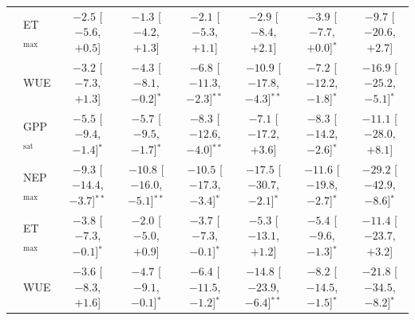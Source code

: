 \begin{table}[htbp]
{\begin{tabular}{llcccccc}
 & ET$_\mathrm{max}$ & $-2.5$ {\tiny[$-5.6$, $+0.5$]} & $-1.3$ {\tiny[$-4.2$, $+1.3$]} & $-2.1$ {\tiny[$-5.3$, $+1.1$]} & $-2.9$ {\tiny[$-8.4$, $+2.1$]} & $-3.9$ {\tiny[$-7.7$, $+0.0$]}$^{*}$ & $-9.7$ {\tiny[$-20.6$, $+2.7$]} \\
 & WUE & $-3.2$ {\tiny[$-7.3$, $+1.3$]} & $-4.3$ {\tiny[$-8.1$, $-0.2$]}$^{*}$ & $-6.8$ {\tiny[$-11.3$, $-2.3$]}$^{**}$ & $-10.9$ {\tiny[$-17.8$, $-4.3$]}$^{**}$ & $-7.2$ {\tiny[$-12.2$, $-1.8$]}$^{*}$ & $-16.9$ {\tiny[$-25.2$, $-5.1$]}$^{*}$ \\
\midrule
{} & GPP$_\mathrm{sat}$ & $-5.5$ {\tiny[$-9.4$, $-1.4$]}$^{*}$ & $-5.7$ {\tiny[$-9.5$, $-1.7$]}$^{*}$ & $-8.3$ {\tiny[$-12.6$, $-4.0$]}$^{**}$ & $-7.1$ {\tiny[$-17.2$, $+3.6$]} & $-8.3$ {\tiny[$-14.2$, $-2.6$]}$^{*}$ & $-11.1$ {\tiny[$-28.0$, $+8.1$]} \\
 & NEP$_\mathrm{max}$ & $-9.3$ {\tiny[$-14.4$, $-3.7$]}$^{**}$ & $-10.8$ {\tiny[$-16.0$, $-5.1$]}$^{**}$ & $-10.5$ {\tiny[$-17.3$, $-3.4$]}$^{*}$ & $-17.5$ {\tiny[$-30.7$, $-2.1$]}$^{*}$ & $-11.6$ {\tiny[$-19.8$, $-2.7$]}$^{*}$ & $-29.2$ {\tiny[$-42.9$, $-8.6$]}$^{*}$ \\
 & ET$_\mathrm{max}$ & $-3.8$ {\tiny[$-7.3$, $-0.1$]}$^{*}$ & $-2.0$ {\tiny[$-5.0$, $+0.9$]} & $-3.7$ {\tiny[$-7.3$, $-0.1$]}$^{*}$ & $-5.3$ {\tiny[$-13.1$, $+1.2$]} & $-5.4$ {\tiny[$-9.6$, $-1.3$]}$^{*}$ & $-11.4$ {\tiny[$-23.7$, $+3.2$]} \\
 & WUE & $-3.6$ {\tiny[$-8.3$, $+1.6$]} & $-4.7$ {\tiny[$-9.1$, $-0.1$]}$^{*}$ & $-6.4$ {\tiny[$-11.5$, $-1.2$]}$^{*}$ & $-14.8$ {\tiny[$-23.9$, $-6.4$]}$^{**}$ & $-8.2$ {\tiny[$-14.5$, $-1.5$]}$^{*}$ & $-21.8$ {\tiny[$-34.5$, $-8.2$]}$^{*}$ \\
\bottomrule
\end{tabular}}
\end{table}
